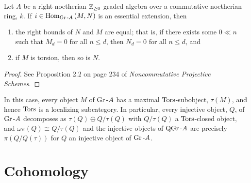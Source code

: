 \documentclass[dissertation.tex]{subfiles}
\begin{document}
\begin{prop}
  Let $A$ be a right noetherian $\mathbb{Z}_{\geq 0}$ graded algebra over a commutative noetherian ring, $k$.
  If $i \in \operatorname{Hom}_{\operatorname{Gr}\text{-}A}\left(M, N\right)$ is an essential extension, then
  \begin{enumerate}
  \item
    the right bounds of $N$ and $M$ are equal; that is, if there exists some $0 \ll n$ such that $M_d = 0$ for all $n \leq d$, then $N_d = 0$ for all $n \leq d$, and
  \item
    if $M$ is torsion, then so is $N$.
  \end{enumerate}
  \begin{proof}
    See Proposition 2.2 on page 234 of {\it Noncommutative Projective Schemes}.
  \end{proof}
\end{prop}

\begin{rmk}
  In this case, every object $M$ of $\operatorname{Gr}\text{-}A$ has a maximal $\operatorname{Tors}$-subobject, $\tau(M)$, and hence $\operatorname{Tors}$ is a localizing subcategory.
  In particular, every injective object, $Q$, of $\operatorname{Gr}\text{-}A$ decomposes as $\tau(Q) \oplus Q/\tau(Q)$ with $Q/\tau(Q)$ a $\operatorname{Tors}$-closed object, and $\omega\pi(Q) \cong Q/\tau(Q)$ and
  the injective objects of $\operatorname{QGr}\text{-}A$ are precisely $\pi(Q/Q(\tau))$ for $Q$ an injective object of $\operatorname{Gr}\text{-}A$.
\end{rmk}

\section{Cohomology}
\end{document}
